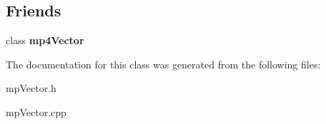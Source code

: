 \subsection*{Friends}
\begin{DoxyCompactItemize}
\item 
\mbox{\label{classmp_vector_a06b54dc8f2143fbb0078d145c1b939d0}} 
class {\bfseries mp4\+Vector}
\end{DoxyCompactItemize}


The documentation for this class was generated from the following files\+:\begin{DoxyCompactItemize}
\item 
mp\+Vector.\+h\item 
mp\+Vector.\+cpp\end{DoxyCompactItemize}
